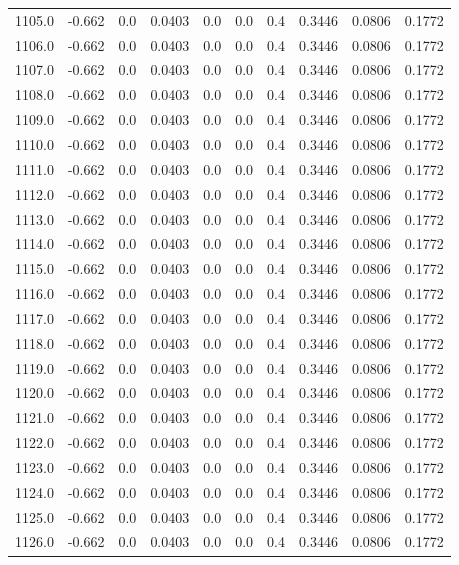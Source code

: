 \begin{longtable}{lrrrrrrrrr}
1105.0 & -0.662 & 0.0 & 0.0403 & 0.0 & 0.0 & 0.4 & 0.3446 & 0.0806 & 0.1772 \\
1106.0 & -0.662 & 0.0 & 0.0403 & 0.0 & 0.0 & 0.4 & 0.3446 & 0.0806 & 0.1772 \\
1107.0 & -0.662 & 0.0 & 0.0403 & 0.0 & 0.0 & 0.4 & 0.3446 & 0.0806 & 0.1772 \\
1108.0 & -0.662 & 0.0 & 0.0403 & 0.0 & 0.0 & 0.4 & 0.3446 & 0.0806 & 0.1772 \\
1109.0 & -0.662 & 0.0 & 0.0403 & 0.0 & 0.0 & 0.4 & 0.3446 & 0.0806 & 0.1772 \\
1110.0 & -0.662 & 0.0 & 0.0403 & 0.0 & 0.0 & 0.4 & 0.3446 & 0.0806 & 0.1772 \\
1111.0 & -0.662 & 0.0 & 0.0403 & 0.0 & 0.0 & 0.4 & 0.3446 & 0.0806 & 0.1772 \\
1112.0 & -0.662 & 0.0 & 0.0403 & 0.0 & 0.0 & 0.4 & 0.3446 & 0.0806 & 0.1772 \\
1113.0 & -0.662 & 0.0 & 0.0403 & 0.0 & 0.0 & 0.4 & 0.3446 & 0.0806 & 0.1772 \\
1114.0 & -0.662 & 0.0 & 0.0403 & 0.0 & 0.0 & 0.4 & 0.3446 & 0.0806 & 0.1772 \\
1115.0 & -0.662 & 0.0 & 0.0403 & 0.0 & 0.0 & 0.4 & 0.3446 & 0.0806 & 0.1772 \\
1116.0 & -0.662 & 0.0 & 0.0403 & 0.0 & 0.0 & 0.4 & 0.3446 & 0.0806 & 0.1772 \\
1117.0 & -0.662 & 0.0 & 0.0403 & 0.0 & 0.0 & 0.4 & 0.3446 & 0.0806 & 0.1772 \\
1118.0 & -0.662 & 0.0 & 0.0403 & 0.0 & 0.0 & 0.4 & 0.3446 & 0.0806 & 0.1772 \\
1119.0 & -0.662 & 0.0 & 0.0403 & 0.0 & 0.0 & 0.4 & 0.3446 & 0.0806 & 0.1772 \\
1120.0 & -0.662 & 0.0 & 0.0403 & 0.0 & 0.0 & 0.4 & 0.3446 & 0.0806 & 0.1772 \\
1121.0 & -0.662 & 0.0 & 0.0403 & 0.0 & 0.0 & 0.4 & 0.3446 & 0.0806 & 0.1772 \\
1122.0 & -0.662 & 0.0 & 0.0403 & 0.0 & 0.0 & 0.4 & 0.3446 & 0.0806 & 0.1772 \\
1123.0 & -0.662 & 0.0 & 0.0403 & 0.0 & 0.0 & 0.4 & 0.3446 & 0.0806 & 0.1772 \\
1124.0 & -0.662 & 0.0 & 0.0403 & 0.0 & 0.0 & 0.4 & 0.3446 & 0.0806 & 0.1772 \\
1125.0 & -0.662 & 0.0 & 0.0403 & 0.0 & 0.0 & 0.4 & 0.3446 & 0.0806 & 0.1772 \\
1126.0 & -0.662 & 0.0 & 0.0403 & 0.0 & 0.0 & 0.4 & 0.3446 & 0.0806 & 0.1772 \\

\end{longtable}
